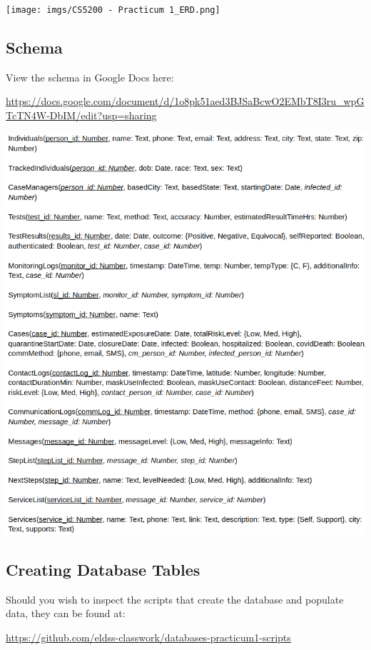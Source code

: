 \documentclass[
]{article}
\begin{document}
\texttt{[image: imgs/CS5200 - Practicum 1\_ERD.png]}\\

\hypertarget{schema}{%
\subsection{Schema}\label{schema}}

View the schema in Google Docs here:

\url{https://docs.google.com/document/d/1o8pk51aed3BJSaBcwO2EMbT8I3ru_wpGTcTN4W-DbIM/edit?usp=sharing}

\includegraphics{imgs/Practicum1-Schema.png}\\

\hypertarget{creating-database-tables}{%
\subsection{Creating Database Tables}\label{creating-database-tables}}

Should you wish to inspect the scripts that create the database and
populate data, they can be found at:

\url{https://github.com/eldss-classwork/databases-practicum1-scripts}
\end{document}
